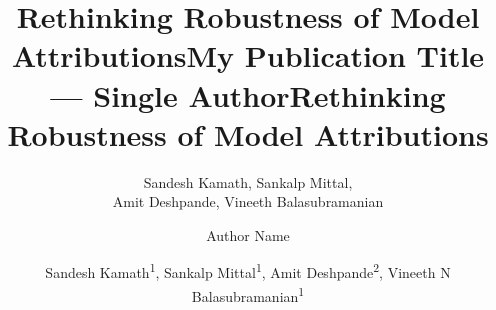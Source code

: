 \documentclass[letterpaper]{article} %
\title{Rethinking Robustness of Model Attributions}
\author{
    Sandesh Kamath,
    Sankalp Mittal,\\
    Amit Deshpande,
    Vineeth Balasubramanian
}
\title{My Publication Title --- Single Author}
\author {
    Author Name
}
\title{Rethinking Robustness of Model Attributions}
\author {
    Sandesh Kamath\textsuperscript{\rm 1},
    Sankalp Mittal\textsuperscript{\rm 1},
    Amit Deshpande\textsuperscript{\rm 2},
    Vineeth N Balasubramanian\textsuperscript{\rm 1}
}
\begin{document}
\maketitle

\begin{abstract}
%

\end{abstract}
\end{document}
